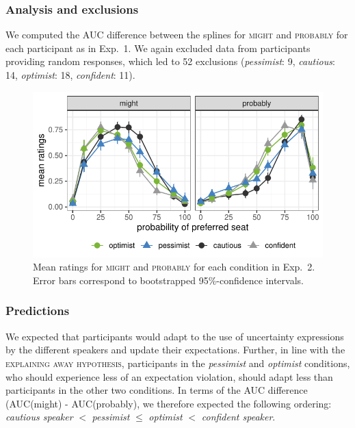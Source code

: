 \subsubsection{Analysis and exclusions}

We computed the AUC difference between the splines for  \textsc{might} and \textsc{probably} for each participant as in Exp.~1. We again excluded data from participants providing random responses, which led to 52 exclusions (\textit{pessimist}: 9, \textit{cautious}: 14, \textit{optimist}: 18, \textit{confident}: 11).

\begin{figure}[t]
    \centering
    \includegraphics[width=\columnwidth, trim={0 0.75cm 0 0cm}]{./plots/explaining-away.pdf}
    \caption{Mean ratings for \textsc{might} and \textsc{probably} for each condition in Exp.~2. Error bars correspond to bootstrapped 95\%-confidence intervals.}
    \label{fig:results-exp2}
\end{figure}
\subsubsection{Predictions}

We expected that participants would adapt to the use of uncertainty expressions by the different speakers and update their expectations. Further, in line with the \textsc{explaining away hypothesis}, participants in the \textit{pessimist} and \textit{optimist} conditions, who should experience less of an expectation violation, should adapt less than participants in the other two conditions. In terms of the AUC difference (AUC(might) - AUC(probably), we therefore expected the following ordering: \textit{cautious speaker} $<$  \textit{pessimist} $\leq$ \textit{optimist} $<$ \textit{confident speaker}.

